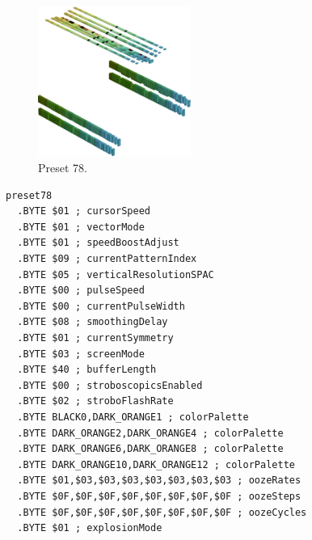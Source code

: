 \clearpage
\begin{minipage}[b]{0.48\linewidth}
\begin{figure}[H]                                                          
  \centering                                                             
  \begin{adjustbox}{width=5cm,center}                                   
  \includegraphics[width=5cm]{src/colorspace_presets/preset78-45.png}%
  \end{adjustbox}                                                        
\caption*{Preset 78.}                                           
\end{figure}                                                               
\end{minipage}
\hspace{0.1cm}
\begin{minipage}[b]{0.48\linewidth}                            
\begin{lstlisting}[basicstyle=\ttfamily\tiny]
preset78
  .BYTE $01 ; cursorSpeed
  .BYTE $01 ; vectorMode
  .BYTE $01 ; speedBoostAdjust
  .BYTE $09 ; currentPatternIndex
  .BYTE $05 ; verticalResolutionSPAC
  .BYTE $00 ; pulseSpeed
  .BYTE $00 ; currentPulseWidth
  .BYTE $08 ; smoothingDelay
  .BYTE $01 ; currentSymmetry
  .BYTE $03 ; screenMode
  .BYTE $40 ; bufferLength
  .BYTE $00 ; stroboscopicsEnabled
  .BYTE $02 ; stroboFlashRate
  .BYTE BLACK0,DARK_ORANGE1 ; colorPalette
  .BYTE DARK_ORANGE2,DARK_ORANGE4 ; colorPalette
  .BYTE DARK_ORANGE6,DARK_ORANGE8 ; colorPalette
  .BYTE DARK_ORANGE10,DARK_ORANGE12 ; colorPalette
  .BYTE $01,$03,$03,$03,$03,$03,$03,$03 ; oozeRates
  .BYTE $0F,$0F,$0F,$0F,$0F,$0F,$0F,$0F ; oozeSteps
  .BYTE $0F,$0F,$0F,$0F,$0F,$0F,$0F,$0F ; oozeCycles
  .BYTE $01 ; explosionMode
\end{lstlisting}
\end{minipage}

\vspace*{-0.5cm}

